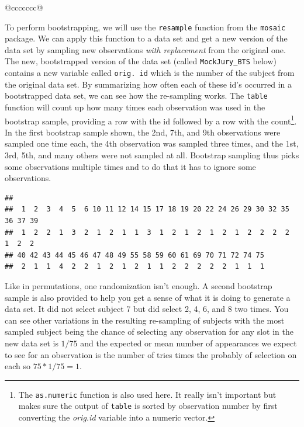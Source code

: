 \documentclass[]{book}
\newenvironment{Shaded}{\begin{snugshade}}{\end{snugshade}}
\newcommand{\KeywordTok}[1]{\textcolor[rgb]{0.13,0.29,0.53}{\textbf{#1}}}
\newcommand{\StringTok}[1]{\textcolor[rgb]{0.31,0.60,0.02}{#1}}
\newcommand{\OperatorTok}[1]{\textcolor[rgb]{0.81,0.36,0.00}{\textbf{#1}}}
\newcommand{\NormalTok}[1]{#1}
\let\rmarkdownfootnote\footnote%
\def\footnote{\protect\rmarkdownfootnote}
\theoremstyle{definition}
\theoremstyle{definition}
\theoremstyle{remark}
\begin{document}
\begin{longtable}[]{@{}ccccccc@{}}
\begin{minipage}[b]{0.10\columnwidth}
\begin{Shaded}
\begin{Highlighting}[]
\begin{Shaded}
\begin{Highlighting}[]
\begin{enumerate}
To perform bootstrapping, we will use the \texttt{resample} function
from the \texttt{mosaic} package. We can apply this function to a data
set and get a new version of the data set by sampling new observations
\emph{with replacement} from the original one. The new, bootstrapped
version of the data set (called \texttt{MockJury\_BTS} below) contains a
new variable called \texttt{orig.\ id} which is the number of the
subject from the original data set. By summarizing how often each of
these id's occurred in a bootstrapped data set, we can see how the
re-sampling works. The \texttt{table} function will count up how many
times each observation was used in the bootstrap sample, providing a row
with the id followed by a row with the count\footnote{The
  \texttt{as.numeric} function is also used here. It really isn't
  important but makes sure the output of \texttt{table} is sorted by
  observation number by first converting the \emph{orig.id} variable
  into a numeric vector.}. In the first bootstrap sample shown, the 2nd,
7th, and 9th observations were sampled one time each, the 4th
observation was sampled three times, and the 1st, 3rd, 5th, and many
others were not sampled at all. Bootstrap sampling thus picks some
observations multiple times and to do that it has to ignore some
observations.

\newpage

\begin{Shaded}
\end{Shaded}

\begin{verbatim}
## 
##  1  2  3  4  5  6 10 11 12 14 15 17 18 19 20 22 24 26 29 30 32 35 36 37 39 
##  1  2  2  1  3  2  1  2  1  1  3  1  2  1  2  1  2  1  2  2  2  2  1  2  2 
## 40 42 43 44 45 46 47 48 49 55 58 59 60 61 69 70 71 72 74 75 
##  2  1  1  4  2  2  1  2  1  2  1  1  2  2  2  2  2  1  1  1
\end{verbatim}

Like in permutations, one randomization isn't enough. A second bootstrap
sample is also provided to help you get a sense of what it is doing to
generate a data set. It did not select subject 7 but did select 2, 4, 6,
and 8 two times. You can see other variations in the resulting
re-sampling of subjects with the most sampled subject being the chance
of selecting any observation for any slot in the new data set is
\(1/75\) and the expected or mean number of appearances we expect to see
for an observation is the number of tries times the probably of
selection on each so \(75*1/75=1\).


\end{enumerate}
\end{Highlighting}
\end{Shaded}
\end{Highlighting}
\end{Shaded}
\end{minipage}
\end{longtable}
\end{document}
